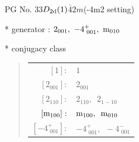 \documentclass[fleqn,8pt]{jsarticle}
\begin{document}
\setcounter{MaxMatrixCols}{32}

\renewcommand{\tablename}{Table~}
\renewcommand{\figurename}{Figure~}
\begin{center}
\LARGE
PG No. 33\quad$D_{\rm 2d}(1)$\quad$\bar{4}2m$\quad(-4m2 setting)\quad[ tetragonal ]
\end{center}

* generator : $2{}_{001},\,\,-4^{+}_{\,\,001},\,\,{\rm m}_{010}$

* conjugacy class
\begin{quote}
\begin{tabular}{rl}
$ [1]: $ & $ 1 $ \\
$ [2{}_{001}]: $ & $ 2{}_{001} $ \\
$ [2{}_{110}]: $ & $ 2{}_{110},\,\,\,2{}_{1-10} $ \\
$ [{\rm m}_{100}]: $ & $ {\rm m}_{100},\,\,\,{\rm m}_{010} $ \\
$ [-4^{+}_{\,\,001}]: $ & $ -4^{+}_{\,\,001},\,\,\,-4^{-}_{\,\,001} $
\end{tabular}
\end{quote}
\end{document}
